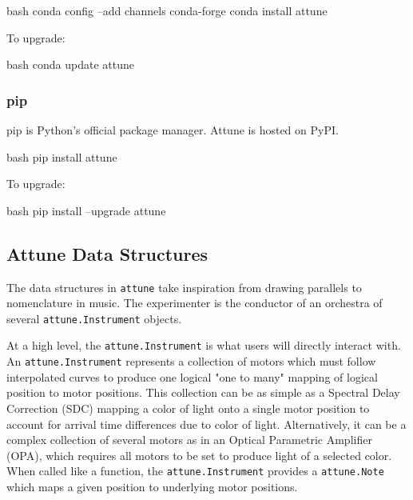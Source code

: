 \begin{codefragment}{bash}
conda config --add channels conda-forge
conda install attune
\end{codefragment}

To upgrade:

\begin{codefragment}{bash}
conda update attune
\end{codefragment}

\hypertarget{pip}{%
\subsubsection{pip}\label{pip}}

pip\cite{pip} is Python's official
package manager. Attune is
hosted on PyPI\cite{attune-pypi}.

\begin{codefragment}{bash}
pip install attune
\end{codefragment}

To upgrade:

\begin{codefragment}{bash}
pip install --upgrade attune
\end{codefragment}
\hypertarget{attune-data-structures}{%
\subsection{Attune Data Structures}\label{attune-data-structures}}

The data structures in \texttt{attune} take inspiration from drawing
parallels to nomenclature in music. The experimenter is the conductor of
an orchestra of several \texttt{attune.Instrument}
objects.

At a high level, the \texttt{attune.Instrument} is what
users will directly interact with. An
\texttt{attune.Instrument} represents a collection of
motors which must follow interpolated curves to produce one logical "one
to many" mapping of logical position to motor positions. This collection
can be as simple as a Spectral Delay Correction (SDC) mapping a color of
light onto a single motor position to account for arrival time
differences due to color of light. Alternatively, it can be a complex
collection of several motors as in an Optical Parametric Amplifier
(OPA), which requires all motors to be set to produce light of a
selected color. When called like a function, the
\texttt{attune.Instrument} provides a
\texttt{attune.Note} which maps a given position to
underlying motor positions.

